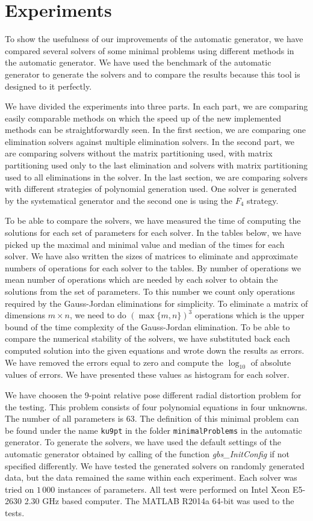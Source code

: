 \chapter{Experiments}
To show the usefulness of our improvements of the automatic generator, we have compared several solvers of some minimal problems using different methods in the automatic generator. We have used the benchmark of the automatic generator to generate the solvers and to compare the results because this tool is designed to it perfectly.

We have divided the experiments into three parts. In each part, we are comparing easily comparable methods on which the speed up of the new implemented methods can be straightforwardly seen. In the first section, we are comparing one elimination solvers against multiple elimination solvers. In the second part, we are comparing solvers without the matrix partitioning used, with matrix partitioning used only to the last elimination and solvers with matrix partitioning used to all eliminations in the solver. In the last section, we are comparing solvers with different strategies of polynomial generation used. One solver is generated by the systematical generator and the second one is using the $F_4$ strategy.

To be able to compare the solvers, we have measured the time of computing the solutions for each set of parameters for each solver. In the tables below, we have picked up the maximal and minimal value and median of the times for each solver. We have also written the sizes of matrices to eliminate and approximate numbers of operations for each solver to the tables. By number of operations we mean number of operations which are needed by each solver to obtain the solutions from the set of parameters. To this number we count only operations required by the Gauss-Jordan eliminations for simplicity. To eliminate a matrix of dimensions $m \times n$, we need to do $(\max\{m, n\})^3$ operations which is the upper bound of the time complexity of the Gauss-Jordan elimination. To be able to compare the numerical stability of the solvers, we have substituted back each computed solution into the given equations and wrote down the results as errors. We have removed the errors equal to zero and compute the $\log_{10}$ of absolute values of errors. We have presented these values as histogram for each solver.

We have choosen the 9-point relative pose different radial distortion problem \cite{9pt} for the testing. This problem consists of four polynomial equations in four unknowns. The number of all parameters is 63. The definition of this minimal problem can be found under the name \texttt{ku9pt} in the folder \texttt{minimalProblems} in the automatic generator. To generate the solvers, we have used the default settings of the automatic generator obtained by calling of the function \textit{gbs\_InitConfig} if not specified differently. We have tested the generated solvers on randomly generated data, but the data remained the same within each experiment. Each solver was tried on $1\,000$ instances of parameters. All test were performed on Intel Xeon E5-2630 2.30 GHz based computer. The MATLAB R2014a 64-bit was used to the tests.

